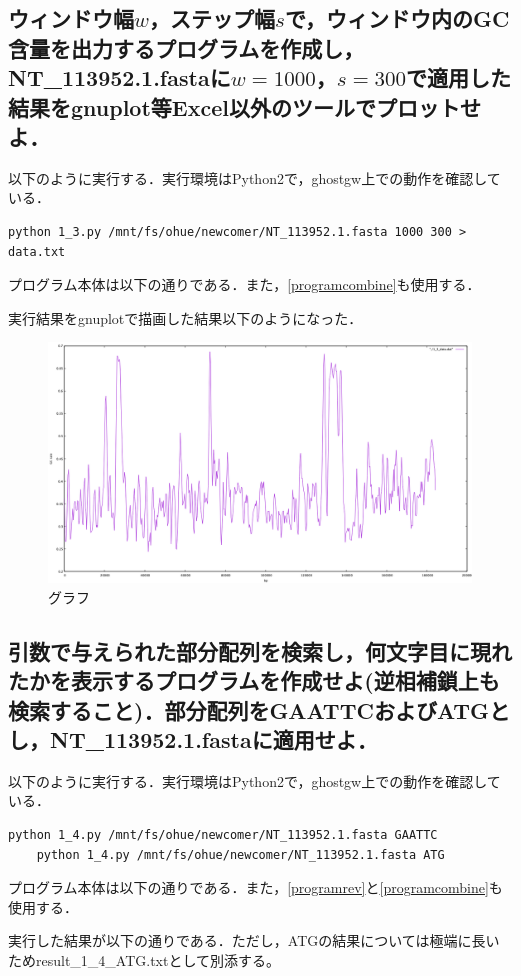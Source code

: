 \documentclass[uplatex,a4j]{jsarticle}
\begin{document}
  \subsection{ウィンドウ幅$w$，ステップ幅$s$で，ウィンドウ内のGC含量を出力するプログラムを作成し，NT\_113952.1.fastaに$w=1000$，$s=300$で適用した結果をgnuplot等Excel以外のツールでプロットせよ．}
  以下のように実行する．実行環境はPython2で，ghostgw上での動作を確認している．
  \begin{lstlisting}[caption=実行方法, label=run3]
    python 1_3.py /mnt/fs/ohue/newcomer/NT_113952.1.fasta 1000 300 > data.txt
  \end{lstlisting}
  プログラム本体は以下の通りである．また，\ref{programcombine}も使用する．
  
  実行結果をgnuplotで描画した結果以下のようになった．
  \begin{figure}[htbp]
    \begin{center}
      \includegraphics[width=15cm]{1_3_plot.png}
      \caption{グラフ}
    \end{center}
  \end{figure}
  
  \subsection{引数で与えられた部分配列を検索し，何文字目に現れたかを表示するプログラムを作成せよ(逆相補鎖上も検索すること)．部分配列をGAATTCおよびATGとし，NT\_113952.1.fastaに適用せよ．}
  以下のように実行する．実行環境はPython2で，ghostgw上での動作を確認している．
  \begin{lstlisting}[caption=実行方法, label=run4]
    python 1_4.py /mnt/fs/ohue/newcomer/NT_113952.1.fasta GAATTC
    python 1_4.py /mnt/fs/ohue/newcomer/NT_113952.1.fasta ATG
  \end{lstlisting}
  プログラム本体は以下の通りである．また，\ref{programrev}と\ref{programcombine}も使用する．
  
  
  実行した結果が以下の通りである．ただし，ATGの結果については極端に長いためresult\_1\_4\_ATG.txtとして別添する。
  
  
\end{document}
